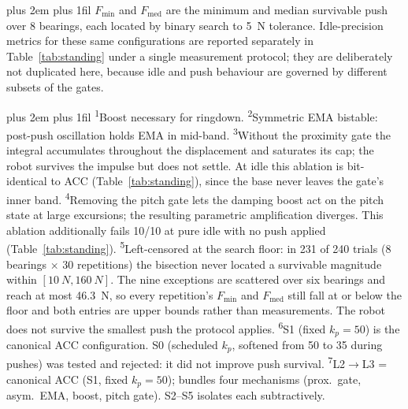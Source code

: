 \documentclass[conference]{IEEEtran}
\newcommand{\tabnote}{\par\leftskip=0pt\rightskip=0pt plus 2em%
  \parfillskip=0pt plus 1fil\relax}
\begin{document}
\begin{table}[!tbp]
\begin{tabular}{@{}c>{\raggedright\arraybackslash}p{3.1cm}rr>{\raggedright\arraybackslash}p{1.5cm}@{}}
\bottomrule
\end{tabular}
\vspace{2pt}\tabnote\noindent
$F_{\min}$ and $F_{\text{med}}$ are the minimum and median survivable push over \num{8} bearings, each located by binary search to \SI{5}{N} tolerance. Idle-precision metrics for these same configurations are reported separately in Table~\ref{tab:standing} under a single measurement protocol; they are deliberately not duplicated here, because idle and push behaviour are governed by different subsets of the gates.\tabnote\noindent
\textsuperscript{1}Boost necessary for ringdown.
\textsuperscript{2}Symmetric EMA bistable: post-push oscillation holds EMA in mid-band.
\textsuperscript{3}Without the proximity gate the integral accumulates throughout the displacement and saturates its cap; the robot survives the impulse but does not settle. At idle this ablation is bit-identical to ACC (Table~\ref{tab:standing}), since the base never leaves the gate's inner band.
\textsuperscript{4}Removing the pitch gate lets the damping boost act on the pitch state at large excursions; the resulting parametric amplification diverges. This ablation additionally fails \num{10}/\num{10} at pure idle with no push applied (Table~\ref{tab:standing}).
\textsuperscript{5}Left-censored at the search floor: in \num{231} of \num{240} trials (\num{8} bearings ${\times}$ \num{30} repetitions) the bisection never located a survivable magnitude within $[\SI{10}{N},\SI{160}{N}]$. The nine exceptions are scattered over six bearings and reach at most \SI{46.3}{N}, so every repetition's $F_{\min}$ and $F_{\text{med}}$ still fall at or below the floor and both entries are upper bounds rather than measurements. The robot does not survive the smallest push the protocol applies.
\textsuperscript{6}S1 (fixed $k_p{=}50$) is the canonical ACC configuration. S0 (scheduled $k_p$, softened from 50 to 35 during pushes) was tested and rejected: it did not improve push survival. \textsuperscript{7}L2$\rightarrow$L3 = canonical ACC (S1, fixed $k_p{=}50$); bundles four mechanisms (prox.\ gate, asym.\ EMA, boost, pitch gate). S2--S5 isolates each subtractively.

\end{table}
\end{document}
